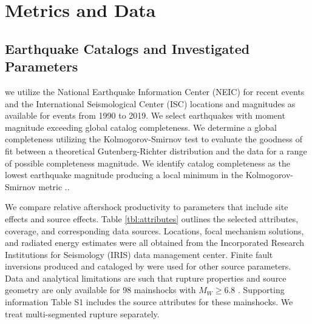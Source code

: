 \documentclass[draft, jgrga]{agujournal2018}
\begin{document}
\section{Metrics and Data}
   
\subsection{Earthquake Catalogs and Investigated Parameters}

 we utilize the National Earthquake Information Center (NEIC) for recent events and the International Seismological Center (ISC) locations and magnitudes as available for events from 1990 to 2019. We select earthquakes with moment magnitude exceeding global catalog completeness. We determine a global completeness utilizing the Kolmogorov-Smirnov test to evaluate the goodness of fit between a theoretical Gutenberg-Richter distribution and the data for a range of possible completeness magnitude. We identify catalog completeness as the lowest earthquake magnitude producing a local minimum in the Kolmogorov-Smirnov metric \citep[following][]{Clauset2009Power-lawData, Goebel2017WhatExperiments}.. 


We compare relative aftershock productivity to parameters that include site effects and source effects. Table \ref{tbl:attributes} outlines the selected attributes, coverage, and corresponding data sources. Locations, focal mechanism solutions, and radiated energy estimates were all obtained from the Incorporated Research Institutions for Seismology (IRIS) data management center. Finite fault inversions produced and cataloged by \citet{Hayes2017} were used for other source parameters. Data and analytical limitations are such that rupture properties and source geometry are only available for 98 mainshocks with $M_W\ge6.8$ \citep{Hayes2017}. Supporting information Table S1 includes the source attributes for these mainshocks. We treat multi-segmented rupture separately.
\end{document}
